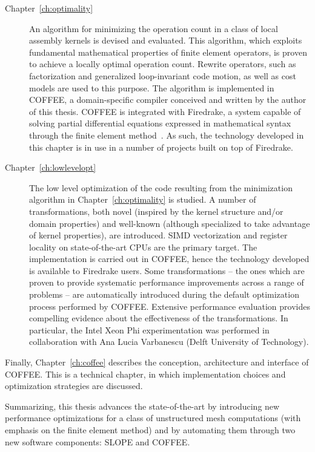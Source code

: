 \begin{description}
\item[Chapter~\ref{ch:optimality}] An algorithm for minimizing the operation count in a class of local assembly kernels is devised and evaluated. This algorithm, which exploits fundamental mathematical properties of finite element operators, is proven to achieve a locally optimal operation count. Rewrite operators, such as factorization and generalized loop-invariant code motion, as well as cost models are used to this purpose. The algorithm is implemented in COFFEE, a domain-specific compiler conceived and written by the author of this thesis. COFFEE is integrated with Firedrake, a system capable of solving partial differential equations expressed in mathematical syntax through the finite element method~\citep{firedrake-paper}. As such, the technology developed in this chapter is in use in a number of projects built on top of Firedrake.

\item[Chapter~\ref{ch:lowlevelopt}] The low level optimization of the code resulting from the minimization algorithm in Chapter~\ref{ch:optimality} is studied. A number of transformations, both novel (inspired by the kernel structure and/or domain properties) and well-known (although specialized to take advantage of kernel properties), are introduced. SIMD vectorization and register locality on state-of-the-art CPUs are the primary target. The implementation is carried out in COFFEE, hence the technology developed is available to Firedrake users. Some transformations -- the ones which are proven to provide systematic performance improvements across a range of problems -- are automatically introduced during the default optimization process performed by COFFEE. Extensive performance evaluation provides compelling evidence about the effectiveness of the transformations. In particular, the Intel Xeon Phi experimentation was performed in collaboration with Ana Lucia Varbanescu (Delft University of Technology).
\end{description}

Finally, Chapter~\ref{ch:coffee} describes the conception, architecture and interface of COFFEE. This is a technical chapter, in which implementation choices and optimization strategies are discussed.

Summarizing, this thesis advances the state-of-the-art by introducing new performance optimizations for a class of unstructured mesh computations (with emphasis on the finite element method) and by automating them through two new software components: SLOPE and COFFEE.


